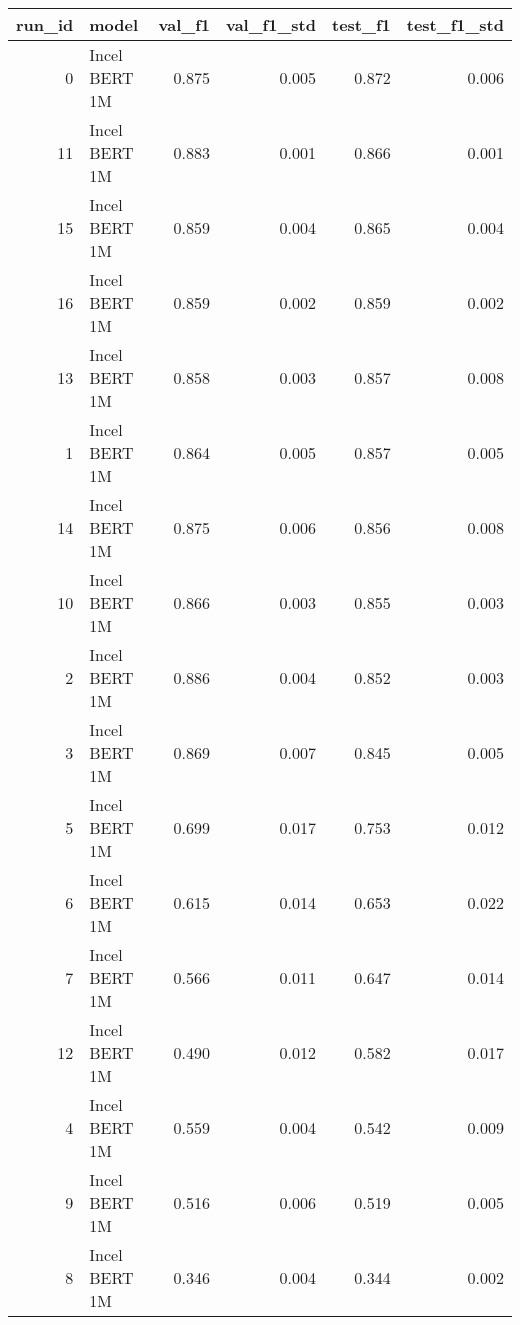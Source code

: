 \begin{tabular}{rlrrrr}
\toprule
 run\_id &         model &  val\_f1 &  val\_f1\_std &  test\_f1 &  test\_f1\_std \\
\midrule
      0 & Incel BERT 1M &   0.875 &       0.005 &    0.872 &        0.006 \\
     11 & Incel BERT 1M &   0.883 &       0.001 &    0.866 &        0.001 \\
     15 & Incel BERT 1M &   0.859 &       0.004 &    0.865 &        0.004 \\
     16 & Incel BERT 1M &   0.859 &       0.002 &    0.859 &        0.002 \\
     13 & Incel BERT 1M &   0.858 &       0.003 &    0.857 &        0.008 \\
      1 & Incel BERT 1M &   0.864 &       0.005 &    0.857 &        0.005 \\
     14 & Incel BERT 1M &   0.875 &       0.006 &    0.856 &        0.008 \\
     10 & Incel BERT 1M &   0.866 &       0.003 &    0.855 &        0.003 \\
      2 & Incel BERT 1M &   0.886 &       0.004 &    0.852 &        0.003 \\
      3 & Incel BERT 1M &   0.869 &       0.007 &    0.845 &        0.005 \\
      5 & Incel BERT 1M &   0.699 &       0.017 &    0.753 &        0.012 \\
      6 & Incel BERT 1M &   0.615 &       0.014 &    0.653 &        0.022 \\
      7 & Incel BERT 1M &   0.566 &       0.011 &    0.647 &        0.014 \\
     12 & Incel BERT 1M &   0.490 &       0.012 &    0.582 &        0.017 \\
      4 & Incel BERT 1M &   0.559 &       0.004 &    0.542 &        0.009 \\
      9 & Incel BERT 1M &   0.516 &       0.006 &    0.519 &        0.005 \\
      8 & Incel BERT 1M &   0.346 &       0.004 &    0.344 &        0.002 \\
\bottomrule
\end{tabular}

